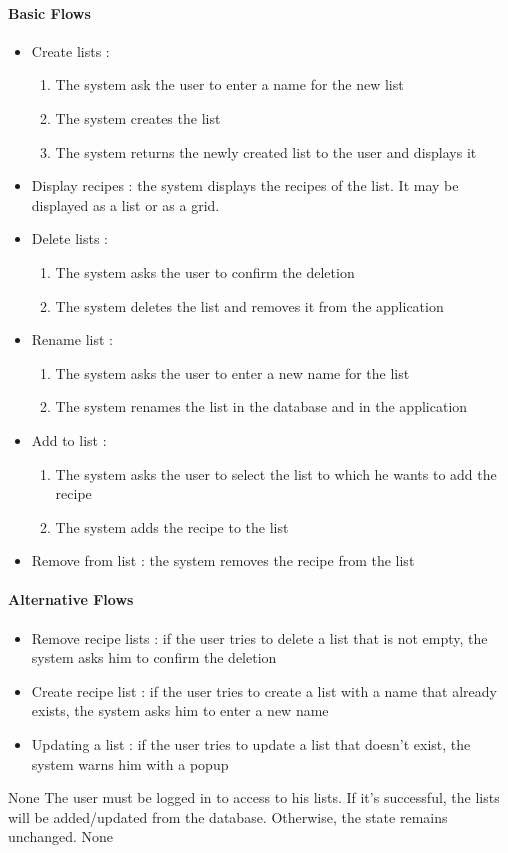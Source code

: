 {  \paragraph{Basic Flows}
  \begin{itemize}
    \item Create lists :
    \begin{enumerate}
      \item The system ask the user to enter a name for the new list
      \item The system creates the list
      \item The system returns the newly created list to the user and displays it
    \end{enumerate}
    \item Display recipes : the system displays the recipes of the list. It may be displayed as a list or as a grid.
    \item Delete lists :
    \begin{enumerate}
      \item The system asks the user to confirm the deletion
      \item The system deletes the list and removes it from the application
    \end{enumerate}
    \item Rename list :
    \begin{enumerate}
      \item The system asks the user to enter a new name for the list
      \item The system renames the list in the database and in the application
    \end{enumerate}
    \item Add to list :
    \begin{enumerate}
      \item The system asks the user to select the list to which he wants to add the recipe
      \item The system adds the recipe to the list
    \end{enumerate}
    \item Remove from list : the system removes the recipe from the list
  \end{itemize}

  \paragraph{Alternative Flows}
  \begin{itemize}
    \item Remove recipe lists : if the user tries to delete a list that is not empty, the system asks him to confirm the deletion
    \item Create recipe list : if the user tries to create a list with a name that already exists, the system asks him to enter a new name
    \item Updating a list : if the user tries to update a list that doesn't exist, the system warns him with a popup
  \end{itemize}
}
{
  None
}
{
  The user must be logged in to access to his lists.
}
{
  If it’s successful, the lists will be added/updated from the database. Otherwise, the state remains unchanged.
}
{
  None
}

